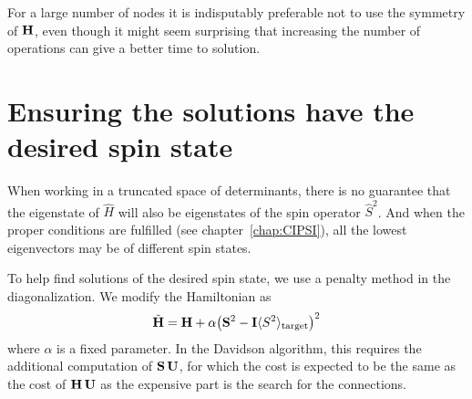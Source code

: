 \documentclass[./thesis.tex]{subfiles}
\begin{document}
For a large number of nodes it is indisputably preferable not to use the
symmetry of $\mathbf{H}$, even though it might seem surprising that increasing the
number of operations can give a better time to solution.

%
%



\section{Ensuring the solutions have the desired spin state}

When working in a truncated space of determinants, there is no guarantee that the eigenstate of $\hat H$ will also be eigenstates of the spin operator $\hat S^2$. And when the proper conditions are fulfilled (see chapter~\ref{chap:CIPSI}), all the lowest eigenvectors may be of different spin states.

To help find solutions of the desired spin state, we use a penalty method in the diagonalization.\cite{Fales2017Sep} We modify the Hamiltonian as 
\begin{equation}
\tilde{\mathbf{H}} = \mathbf{H} + \alpha \qty( \mathbf{S}^2 - \mathbf{I} \langle S^2 \rangle_\text{target} )^2
\end{equation}
where $\alpha$ is a fixed parameter.
In the Davidson algorithm, this requires the additional computation of $\mathbf{S}\, \mathbf{U}$, for which the
cost is expected to be the same as the cost of $\mathbf{H} \, \mathbf{U}$ as the expensive part is the search for the
connections.
\end{document}
